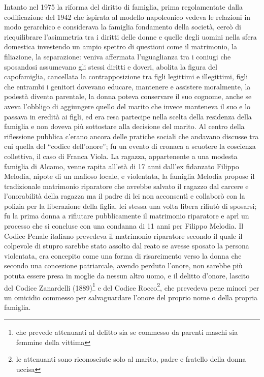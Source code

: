 Intanto nel 1975 la riforma del diritto di famiglia, prima regolamentate dalla codificazione del 1942 che ispirata al modello napoleonico vedeva le relazioni in modo gerarchico e considerava la famiglia fondamento della società, cercò di riequilibrare l'asimmetria tra i diritti delle donne e quelle degli uomini nella sfera domestica investendo un ampio spettro di questioni come il matrimonio, la filiazione, la separazione: veniva affermata l'uguaglianza tra i coniugi che sposandosi assumevano gli stessi diritti e doveri, abolita la figura del capofamiglia, cancellata la contrapposizione tra figli legittimi e illegittimi, figli che entrambi i genitori dovevano educare, mantenere e assistere moralmente, la podestà diventa parentale, la donna poteva conservare il suo cognome, anche se aveva l'obbligo di aggiungere quello del marito che invece manteneva il suo e lo passava in eredità ai figli, ed era resa partecipe nella scelta della residenza della famiglia e non  doveva più sottostare alla decisione del marito.
Al centro della riflessione pubblica c'erano ancora delle pratiche sociali che andavano discusse tra cui quella del \enquote{codice dell'onore}; fu un evento di cronaca a scuotere la coscienza collettiva, il caso di Franca Viola.
La ragazza, appartenente a una modesta famiglia di Alcamo, venne rapita all'età di 17 anni dall'ex fidanzato Filippo Melodia, nipote di un mafioso locale, e violentata, la famiglia Melodia propose il tradizionale matrimonio riparatore che avrebbe salvato il ragazzo dal carcere e l'onorabilità della ragazza ma il padre di lei non acconsentì e collaborò con la polizia per la liberazione della figlia, lei stessa una volta libera rifiutò di sposarsi; fu la prima donna a rifiutare pubblicamente il matrimonio riparatore e aprì un processo che si concluse con una condanna di 11 anni per Filippo Melodia.
Il Codice Penale italiano prevedeva il matrimonio riparatore secondo il quale il colpevole di stupro sarebbe stato assolto dal reato se avesse sposato la persona violentata, era concepito come una forma di risarcimento verso la donna che secondo una concezione patriarcale, avendo perduto l'onore, non sarebbe più potuta essere presa in moglie da nessun altro uomo, e il delitto d'onore, lascito del Codice Zanardelli (1889)\footnote{che prevede attenuanti al delitto sia se commesso da parenti maschi sia femmine della vittima} e del Codice Rocco\footnote{le attenuanti sono riconosciute solo al marito, padre e fratello della donna uccisa}, che prevedeva pene minori per un omicidio commesso per salvaguardare l'onore del proprio nome o della propria famiglia.
